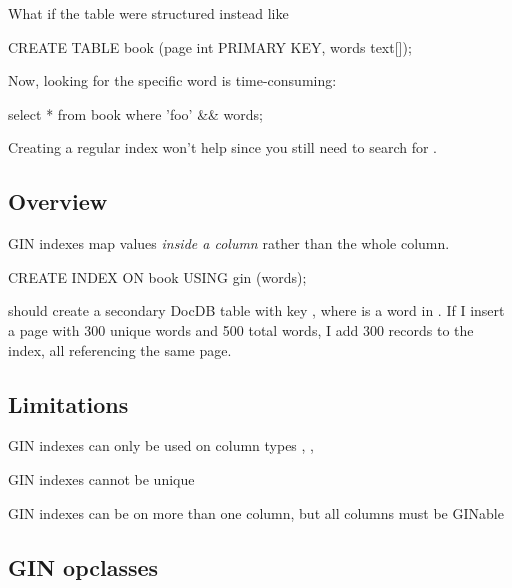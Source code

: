 \documentclass[11pt]{article}
\begin{document}
What if the table were structured instead like

\begin{sqlcode}
CREATE TABLE book (page int PRIMARY KEY, words text[]);
\end{sqlcode}

Now, looking for the specific word  is time-consuming:

\begin{sqlcode}
select * from book where '{foo}' && words;
\end{sqlcode}

Creating a regular index won't help since you still need to search
 for .

\hypertarget{overview}{%
\subsection{Overview}\label{overview}}

GIN indexes map values \emph{inside a column} rather than the whole column.

\begin{sqlcode}
CREATE INDEX ON book USING gin (words);
\end{sqlcode}

should create a secondary DocDB table with key , where  is a word in . If I insert a
page with 300 unique words and 500 total words, I add 300 records to the index,
all referencing the same page.

\hypertarget{limitations}{%
\subsection{Limitations}\label{limitations}}

\begin{oparts}
\item
  GIN indexes can only be used on column types ,
  , 
\item
  GIN indexes cannot be unique
\item
  GIN indexes can be on more than one column, but all columns must be
  GINable
\end{oparts}

\hypertarget{gin-opclasses}{%
\subsection{GIN opclasses}\label{gin-opclasses}}
\end{document}
